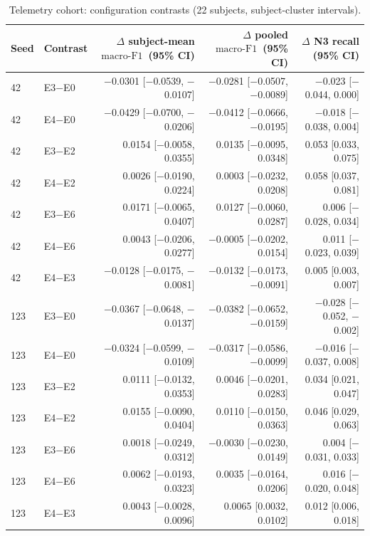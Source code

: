 \documentclass[10pt,a4paper]{article}
\newcommand{\mf}{\ensuremath{\mathrm{macro\text{-}F1}}}
\newcommand{\ci}{95\% CI}
\begin{document}
\begin{table}[H]
\centering\small
\caption{Telemetry cohort: configuration contrasts (22 subjects, subject-cluster intervals).}
\label{tab:sup_telemetry_contrasts}
\begin{tabular}{llrrr}
\toprule
Seed & Contrast & $\Delta$ subject-mean \mf\ (\ci) & $\Delta$ pooled \mf\ (\ci) & $\Delta$ N3 recall (\ci) \\
\midrule
42 & E3$-$E0 & $-$0.0301 [$-$0.0539, $-$0.0107] & $-$0.0281 [$-$0.0507, $-$0.0089] & $-$0.023 [$-$0.044, 0.000] \\
42 & E4$-$E0 & $-$0.0429 [$-$0.0700, $-$0.0206] & $-$0.0412 [$-$0.0666, $-$0.0195] & $-$0.018 [$-$0.038, 0.004] \\
42 & E3$-$E2 & 0.0154 [$-$0.0058, 0.0355] & 0.0135 [$-$0.0095, 0.0348] & 0.053 [0.033, 0.075] \\
42 & E4$-$E2 & 0.0026 [$-$0.0190, 0.0224] & 0.0003 [$-$0.0232, 0.0208] & 0.058 [0.037, 0.081] \\
42 & E3$-$E6 & 0.0171 [$-$0.0065, 0.0407] & 0.0127 [$-$0.0060, 0.0287] & 0.006 [$-$0.028, 0.034] \\
42 & E4$-$E6 & 0.0043 [$-$0.0206, 0.0277] & $-$0.0005 [$-$0.0202, 0.0154] & 0.011 [$-$0.023, 0.039] \\
42 & E4$-$E3 & $-$0.0128 [$-$0.0175, $-$0.0081] & $-$0.0132 [$-$0.0173, $-$0.0091] & 0.005 [0.003, 0.007] \\
123 & E3$-$E0 & $-$0.0367 [$-$0.0648, $-$0.0137] & $-$0.0382 [$-$0.0652, $-$0.0159] & $-$0.028 [$-$0.052, $-$0.002] \\
123 & E4$-$E0 & $-$0.0324 [$-$0.0599, $-$0.0109] & $-$0.0317 [$-$0.0586, $-$0.0099] & $-$0.016 [$-$0.037, 0.008] \\
123 & E3$-$E2 & 0.0111 [$-$0.0132, 0.0353] & 0.0046 [$-$0.0201, 0.0283] & 0.034 [0.021, 0.047] \\
123 & E4$-$E2 & 0.0155 [$-$0.0090, 0.0404] & 0.0110 [$-$0.0150, 0.0363] & 0.046 [0.029, 0.063] \\
123 & E3$-$E6 & 0.0018 [$-$0.0249, 0.0312] & $-$0.0030 [$-$0.0230, 0.0149] & 0.004 [$-$0.031, 0.033] \\
123 & E4$-$E6 & 0.0062 [$-$0.0193, 0.0323] & 0.0035 [$-$0.0164, 0.0206] & 0.016 [$-$0.020, 0.048] \\
123 & E4$-$E3 & 0.0043 [$-$0.0028, 0.0096] & 0.0065 [0.0032, 0.0102] & 0.012 [0.006, 0.018] \\
\bottomrule
\end{tabular}
\end{table}
\end{document}
